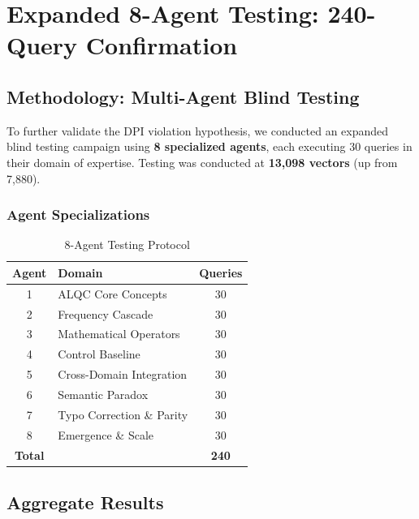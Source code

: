 
\section{Expanded 8-Agent Testing: 240-Query Confirmation}
\label{sec:expanded-8-agent-testing}

\subsection{Methodology: Multi-Agent Blind Testing}

To further validate the DPI violation hypothesis, we conducted an expanded blind testing campaign using \textbf{8 specialized agents}, each executing 30 queries in their domain of expertise. Testing was conducted at \textbf{13,098 vectors} (up from 7,880).

\subsubsection{Agent Specializations}

\begin{table}[h]
\centering
\caption{8-Agent Testing Protocol}
\begin{tabular}{|c|l|c|}
\hline
\textbf{Agent} & \textbf{Domain} & \textbf{Queries} \\
\hline
1 & ALQC Core Concepts & 30 \\
2 & Frequency Cascade & 30 \\
3 & Mathematical Operators & 30 \\
4 & Control Baseline & 30 \\
5 & Cross-Domain Integration & 30 \\
6 & Semantic Paradox & 30 \\
7 & Typo Correction \& Parity & 30 \\
8 & Emergence \& Scale & 30 \\
\hline
\textbf{Total} & & \textbf{240} \\
\hline
\end{tabular}
\end{table}

\subsection{Aggregate Results}

